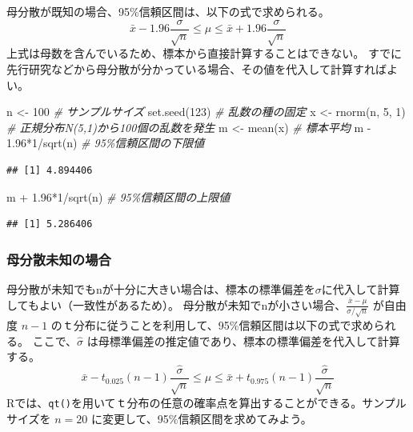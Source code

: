 \documentclass[
  ja=standard, xelatex, base=12pt]{bxjsreport}
\newenvironment{Shaded}{\begin{snugshade}}{\end{snugshade}}
\newcommand{\CommentTok}[1]{\textcolor[rgb]{0.56,0.35,0.01}{\textit{#1}}}
\newcommand{\DecValTok}[1]{\textcolor[rgb]{0.00,0.00,0.81}{#1}}
\newcommand{\FloatTok}[1]{\textcolor[rgb]{0.00,0.00,0.81}{#1}}
\newcommand{\FunctionTok}[1]{\textcolor[rgb]{0.00,0.00,0.00}{#1}}
\newcommand{\NormalTok}[1]{#1}
\newcommand{\OtherTok}[1]{\textcolor[rgb]{0.56,0.35,0.01}{#1}}
\newcommand{\SpecialCharTok}[1]{\textcolor[rgb]{0.00,0.00,0.00}{#1}}
\begin{document}
母分散が既知の場合、95\%信頼区間は、以下の式で求められる。 \[
\bar{x}-1.96\frac{\sigma}{\sqrt{n}}\leq\mu\leq\bar{x}+1.96\frac{\sigma}{\sqrt{n}}
\] 上式は母数を含んでいるため、標本から直接計算することはできない。 すでに先行研究などから母分散が分かっている場合、その値を代入して計算すればよい。

\begin{Shaded}
\begin{Highlighting}[]
\NormalTok{n }\OtherTok{\textless{}{-}} \DecValTok{100} \CommentTok{\# サンプルサイズ}
\FunctionTok{set.seed}\NormalTok{(}\DecValTok{123}\NormalTok{) }\CommentTok{\# 乱数の種の固定}
\NormalTok{x }\OtherTok{\textless{}{-}} \FunctionTok{rnorm}\NormalTok{(n, }\DecValTok{5}\NormalTok{, }\DecValTok{1}\NormalTok{) }\CommentTok{\# 正規分布N(5,1)から100個の乱数を発生}
\NormalTok{m }\OtherTok{\textless{}{-}} \FunctionTok{mean}\NormalTok{(x) }\CommentTok{\# 標本平均}
\NormalTok{m }\SpecialCharTok{{-}} \FloatTok{1.96}\SpecialCharTok{*}\DecValTok{1}\SpecialCharTok{/}\FunctionTok{sqrt}\NormalTok{(n) }\CommentTok{\# 95\%信頼区間の下限値}
\end{Highlighting}
\end{Shaded}

\begin{verbatim}
## [1] 4.894406
\end{verbatim}

\begin{Shaded}
\begin{Highlighting}[]
\NormalTok{m }\SpecialCharTok{+} \FloatTok{1.96}\SpecialCharTok{*}\DecValTok{1}\SpecialCharTok{/}\FunctionTok{sqrt}\NormalTok{(n) }\CommentTok{\# 95\%信頼区間の上限値}
\end{Highlighting}
\end{Shaded}

\begin{verbatim}
## [1] 5.286406
\end{verbatim}

\hypertarget{ux6bcdux5206ux6563ux672aux77e5ux306eux5834ux5408}{%
\subsubsection{母分散未知の場合}\label{ux6bcdux5206ux6563ux672aux77e5ux306eux5834ux5408}}

母分散が未知でもnが十分に大きい場合は、標本の標準偏差を\(\sigma\)に代入して計算してもよい（一致性があるため）。 母分散が未知でnが小さい場合、\(\frac{\bar{x}-\mu}{\sigma/\sqrt{n}}\) が自由度 \(n-1\) のｔ分布に従うことを利用して、95\%信頼区間は以下の式で求められる。 ここで、\(\hat{\sigma}\) は母標準偏差の推定値であり、標本の標準偏差を代入して計算する。\[
\bar{x}-t_{0.025}(n-1)\frac{\hat{\sigma}}{\sqrt{n}}\leq\mu\leq\bar{x}+t_{0.975}(n-1)\frac{\hat{\sigma}}{\sqrt{n}}
\] Rでは、\texttt{qt()}を用いてｔ分布の任意の確率点を算出することができる。サンプルサイズを \(n=20\) に変更して、95\%信頼区間を求めてみよう。
\end{document}

